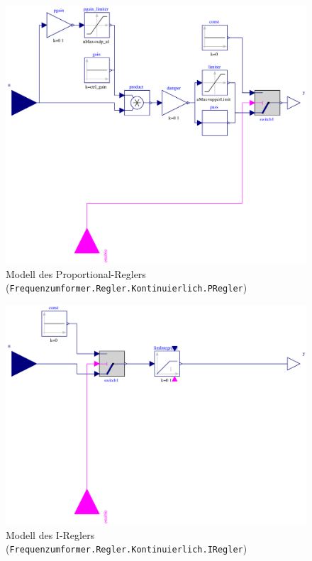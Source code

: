 \begin{figure}
\centering
\includegraphics{Bilder/PRegler.pdf}
\caption{Modell des Proportional-Reglers
(\texttt{Frequenzumformer.Regler.Kontinuierlich.PRegler})}
\end{figure}

\begin{figure}
\centering
\includegraphics{Bilder/IRegler.pdf}
\caption{Modell des I-Reglers
(\texttt{Frequenzumformer.Regler.Kontinuierlich.IRegler})}
\end{figure}

